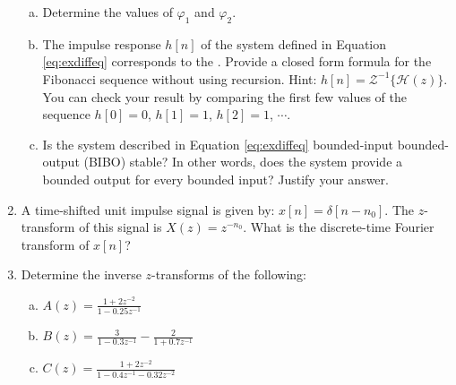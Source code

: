 \begin{enumerate}
\begin{enumerate}[a)]
              \item Determine the values of $\varphi_1$ and $\varphi_2$.

              \item The impulse response $h[n]$ of the system defined in Equation \ref{eq:exdiffeq} corresponds to
                    the \emph{}. Provide a closed form formula for
                    the Fibonacci sequence without using recursion. Hint: $h[n] = \mathcal{Z}^{-1}\{\mathcal{H}(z)\}$.
                    You can check your result by comparing the first few values of the sequence $h[0]=0$, $h[1]=1$, $h[2]=1$, $\cdots$.

              \item Is the system described in Equation \ref{eq:exdiffeq} bounded-input bounded-output (BIBO) stable?
                    In other words, does the system provide a bounded output for every bounded input? Justify your answer.

          \end{enumerate}

    \item A time-shifted unit impulse signal is given by: $x[n]=\delta[n-n_0]$.
          The $z$-transform of this signal is $X(z)=z^{-n_0}$. What is the discrete-time Fourier transform of $x[n]$?

    \item Determine the inverse $z$-transforms of the following:
          \begin{enumerate}[a)]
              \item $A(z)=\frac{1+2z^{-2}}{1-0.25z^{-1}}$ %
              \item $B(z)=\frac{3}{1-0.3z^{-1}} - \frac{2}{1+0.7z^{-1}}$ %
              \item $C(z)=\frac{1+2z^{-2}}{1-0.4z^{-1}-0.32 z^{-2}}$ %
          \end{enumerate}


\end{enumerate}
